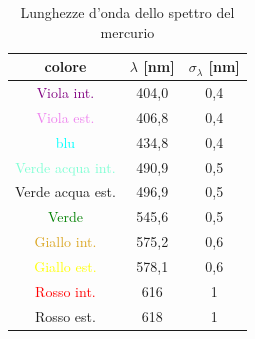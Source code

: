 \documentclass{article}
\begin{document}
        \begin{table}[H]

            \centering
            \begin{tabular}{c c c}

                \toprule 

                \textbf{colore}                     &  \textbf{$\lambda$ [nm]}  & \textbf{$\sigma_{\lambda}$ [nm]} \\

                \midrule

                \textcolor{purple}{Viola int.}	         &	   404,0	    &	  0,4                 \\
                \textcolor{violet}{Viola est.}           &	   406,8	    &	  0,4                 \\
                \textcolor{cyan}{blu}                    &	   434,8	    &	  0,4                 \\
                \textcolor{Aquamarine}{Verde acqua int.} &	   490,9	    &	  0,5                 \\
                \textcolor{Emerald}{Verde acqua est.}	 &	   496,9	    &	  0,5                 \\
                \textcolor{green}{Verde}                 &	   545,6	    &	  0,5                 \\
                \textcolor{Goldenrod}{Giallo int.}     	 &	   575,2	    &	  0,6                 \\
                \textcolor{yellow}{Giallo est.}	         &	   578,1	    &	  0,6                 \\
                \textcolor{red}{Rosso int.}              &	   616	        &	  1                   \\
                \textcolor{BrickRed}{Rosso est.}         &	   618 	        &	  1                   \\

                \bottomrule
        
            \end{tabular}

            \caption{Lunghezze d'onda dello spettro del mercurio}
            \label{tabular:Lambda spettro}

        \end{table}
\end{document}
